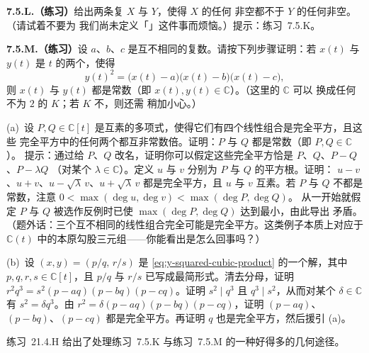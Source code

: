 \textbf{7.5.L.（练习）}\quad 给出两条\trSmooth{}复\trCurve{} $X$ 与 $Y$，使得 $X$ 的任何%
非空\trOpenSubset{}都不\trIsomorphic{}于 $Y$ 的任何非空\trOpenSubset。（请试着不要为%
我们尚未定义「\trSmoothness」这件事而烦恼。）提示：练习~7.5.K。

\textbf{7.5.M.（练习）}\quad 设 $a$、$b$、$c$ 是互不相同的复数。请按下列步骤证明：若%
$x(t)$ 与 $y(t)$ 是 $t$ 的两个\trRationalFunction，使得
\begin{equation*}\tag{7.5.11.1}\label{eq:y-squared-cubic-product}
y(t)^2=\bigl(x(t)-a\bigr)\bigl(x(t)-b\bigr)\bigl(x(t)-c\bigr),
\end{equation*}
则 $x(t)$ 与 $y(t)$ 都是常数（即 $x(t),y(t)\in\mathbb{C}$）。（这里的 $\mathbb{C}$ 可以%
换成任何\trCharacteristic{}不为 $2$ 的\trField{} $K$；若 $K$ 不\trAlgClosed，则还需%
稍加小心。）

(a)~设 $P,Q\in\mathbb{C}[t]$ 是互素的多项式，使得它们有四个线性组合是完全平方，且这些%
完全平方中的任何两个都互非常数倍。证明：$P$ 与 $Q$ 都是常数（即 $P,Q\in\mathbb{C}$）。%
提示：通过给 $P$、$Q$ 改名，证明你可以假定这些完全平方恰是 $P$、$Q$、$P-Q$、$P-\lambda Q$ %
（对某个 $\lambda\in\mathbb{C}$）。定义 $u$ 与 $v$ 分别为 $P$ 与 $Q$ 的平方根。证明：%
$u-v$、$u+v$、$u-\sqrt{\lambda}\,v$、$u+\sqrt{\lambda}\,v$ 都是完全平方，且 $u$ 与 $v$ %
互素。若 $P$ 与 $Q$ 不都是常数，注意 $0<\max(\deg u,\deg v)<\max(\deg P,\deg Q)$。%
从一开始就假定 $P$ 与 $Q$ 被选作反例时已使 $\max(\deg P,\deg Q)$ 达到最小，由此导出%
矛盾。（题外话：三个互不相同的线性组合完全可能是完全平方。这类例子本质上对应于%
$\mathbb{C}(t)$ 中的本原勾股三元组——你能看出是怎么回事吗？）

(b)~设 $(x,y)=(p/q,\,r/s)$ 是 \eqref{eq:y-squared-cubic-product} 的一个解，其中%
$p,q,r,s\in\mathbb{C}[t]$，且 $p/q$ 与 $r/s$ 已写成最简形式。清去分母，证明%
$r^2q^3=s^2(p-aq)(p-bq)(p-cq)$。证明 $s^2\mid q^3$ 且 $q^3\mid s^2$，从而对某个%
$\delta\in\mathbb{C}$ 有 $s^2=\delta q^3$。由 $r^2=\delta(p-aq)(p-bq)(p-cq)$，证明%
$(p-aq)$、$(p-bq)$、$(p-cq)$ 都是完全平方。再证明 $q$ 也是完全平方，然后援引 (a)。

练习~21.4.H 给出了处理练习~7.5.K 与练习~7.5.M 的一种好得多的几何途径。
